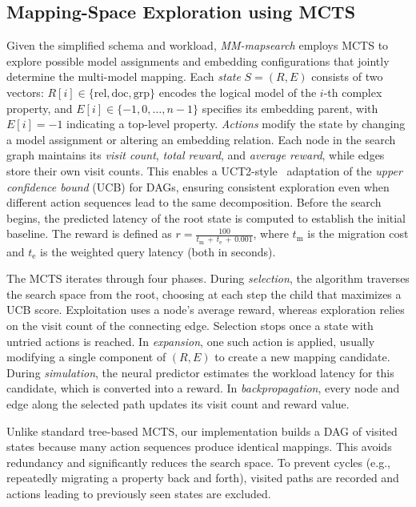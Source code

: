 \subsection{Mapping-Space Exploration using MCTS}
Given the simplified schema and workload, \textit{MM-mapsearch} employs MCTS to explore possible model assignments and embedding configurations that jointly determine the multi-model mapping.
Each \textit{state} $S = (R,E)$ consists of two vectors: $R[i] \in \{\text{rel}, \text{doc}, \text{grp}\}$ encodes the logical model of the $i$-th complex property, and $E[i] \in \{-1,0,\ldots,n-1\}$ specifies its embedding parent, with $E[i] = -1$ indicating a top-level property. \textit{Actions} modify the state by changing a model assignment or altering an embedding relation.
Each node in the search graph maintains its \emph{visit count}, \emph{total reward}, and \emph{average reward}, while edges store their own visit counts. This enables a UCT2-style~\citep{DBLP:conf/cig/ChildsBK08} adaptation of the \textit{upper confidence bound} (UCB) for DAGs, ensuring consistent exploration even when different action sequences lead to the same decomposition. Before the search begins, the predicted latency of the root state is computed to establish the initial baseline. The reward is defined as $r = \frac{100}{t_{\mathrm{m}} \,+\, t_{\mathrm{e}} \,+\, 0.001}$, where $t_{\mathrm{m}}$ is the migration cost and $t_{\mathrm{e}}$ is the weighted query latency (both in seconds).

The MCTS iterates through four phases. During \emph{selection}, the algorithm traverses the search space from the root, choosing at each step the child that maximizes a UCB score. Exploitation uses a node's average reward, whereas exploration relies on the visit count of the connecting edge. Selection stops once a state with untried actions is reached. In \emph{expansion}, one such action is applied, usually modifying a single component of $(R,E)$ to create a new mapping candidate. During \emph{simulation}, the neural predictor estimates the workload latency for this candidate, which is converted into a reward. In \emph{backpropagation}, every node and edge along the selected path updates its visit count and reward value.

Unlike standard tree-based MCTS, our implementation builds a DAG of visited states because many action sequences produce identical mappings. This avoids redundancy and significantly reduces the search space. To prevent cycles (e.g., repeatedly migrating a property back and forth), visited paths are recorded and actions leading to previously seen states are excluded.

